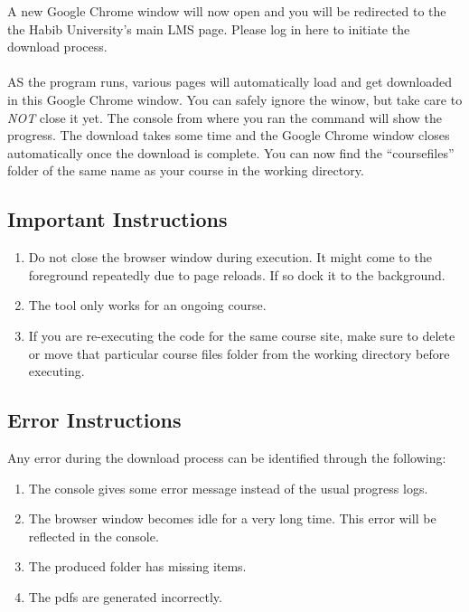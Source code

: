 \documentclass{article}
\begin{document}
A new Google Chrome window will now open and you will be redirected to
the the Habib University's main LMS page. Please log in here to initiate
the download process.
\\\\AS the program runs, various pages will automatically load and get
downloaded in this Google Chrome window. You can safely ignore the
winow, but take care to \emph{NOT} close it yet. The console from where
you ran the command will show the progress. The download takes some time
and the Google Chrome window closes automatically once the download is
complete. You can now find the ``coursefiles'' folder of the same name
as your course in the working directory.

\subsection{Important Instructions}

\begin{enumerate}
\def\labelenumi{\arabic{enumi}.}
\item
  Do not close the browser window during execution. It might come to the
  foreground repeatedly due to page reloads. If so dock it to the
  background.
\item
  The tool only works for an ongoing course.
  \item If you are re-executing the code for the same course site, make sure to delete or move that particular course files folder from the working directory before executing.
\end{enumerate}

\subsection{Error Instructions}
Any error during the download process can be identified through the
following:

\begin{enumerate}
\def\labelenumi{\arabic{enumi}.}
\item
  The console gives some error message instead of the usual progress
  logs.
\item
  The browser window becomes idle for a very long time. This error will
  be reflected in the console.
\item
  The produced folder has missing items.
\item
  The pdfs are generated incorrectly.
\end{enumerate}
\end{document}

